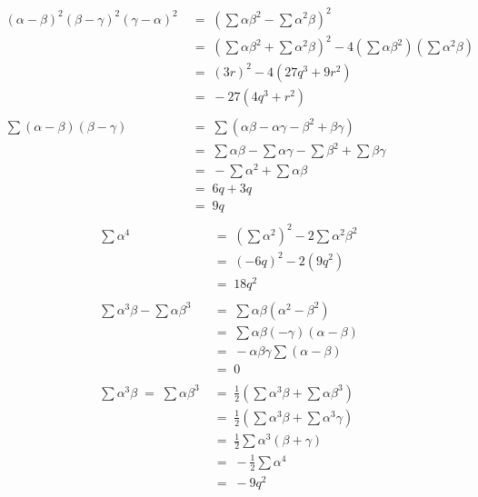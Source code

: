 \documentclass[10pt]{article}
\begin{document}
\begin{align*}
                \\
                (\alpha - \beta)^2(\beta - \gamma)^2(\gamma - \alpha)^2 \;&=\; \left(\sum\alpha\beta^2 - \sum\alpha^2\beta\right)^2 \\
                        \;&=\; \left(\sum\alpha\beta^2 + \sum\alpha^2\beta\right)^2 - 4\left(\sum\alpha\beta^2\right)\left(\sum\alpha^2\beta\right)\\
                        \;&=\; (3r)^2 - 4(27q^3 + 9r^2) \\
                        \;&=\; -27(4q^3 + r^2) \\
                \\
                \sum(\alpha - \beta)(\beta - \gamma) \;&=\; \sum(\alpha\beta - \alpha\gamma - \beta^2 + \beta\gamma) \\
                        \;&=\; \sum\alpha\beta - \sum\alpha\gamma -\sum\beta^2 + \sum\beta\gamma\\
                        \;&=\; -\sum\alpha^2 + \sum\alpha\beta \\
                        \;&=\; 6q + 3q \\
                        \;&=\; 9q \\
        \end{align*}
        \begin{align*}
                \sum\alpha^4 \;&=\; \left(\sum\alpha^2\right)^2 - 2\sum\alpha^2\beta^2 \\
                        \;&=\; (-6q)^2 - 2(9q^2) \\
                        \;&=\; 18q^2 \\
                \\
                \sum\alpha^3\beta - \sum\alpha\beta^3 \;&=\; \sum\alpha\beta(\alpha^2 - \beta^2) \\
                        \;&=\; \sum\alpha\beta(-\gamma)(\alpha - \beta) \\
                        \;&=\; -\alpha\beta\gamma\sum(\alpha - \beta) \\
                        \;&=\; 0\\
                \\
                \sum\alpha^3\beta \;=\; \sum\alpha\beta^3 \;&=\; \frac{1}{2}\left(\sum\alpha^3\beta + \sum\alpha\beta^3\right) \\
                        \;&=\; \frac{1}{2}\left(\sum\alpha^3\beta + \sum\alpha^3\gamma\right) \\
                        \;&=\; \frac{1}{2}\sum\alpha^3(\beta + \gamma) \\
                        \;&=\; -\frac{1}{2} \sum \alpha^4 \\
                        \;&=\; -9q^2 \\
                \\
        \end{align*}
\end{document}
